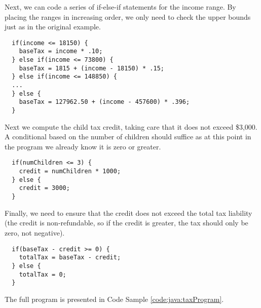 Next, we can code a series of if-else-if statements for the income range.  By
placing the ranges in increasing order, we only need to check the upper bounds
just as in the original example.

\begin{verbatim}
  if(income <= 18150) {
    baseTax = income * .10;
  } else if(income <= 73800) {
    baseTax = 1815 + (income - 18150) * .15;
  } else if(income <= 148850) {
  ...  
  } else {
    baseTax = 127962.50 + (income - 457600) * .396;
  }
\end{verbatim}

Next we compute the child tax credit, taking care that it does
not exceed \$3,000.  A conditional based on the number of children
should suffice as at this point in the program we already know it is
zero or greater.

\begin{verbatim}
  if(numChildren <= 3) {
    credit = numChildren * 1000;
  } else {
    credit = 3000;
  }
\end{verbatim}

Finally, we need to ensure that the credit does not exceed the total tax
liability (the credit is non-refundable, so if the credit is greater, the tax
should only be zero, not negative).  

\begin{verbatim}
  if(baseTax - credit >= 0) {
    totalTax = baseTax - credit;
  } else {
    totalTax = 0;
  }
\end{verbatim}

The full program is presented in Code Sample \ref{code:java:taxProgram}.

